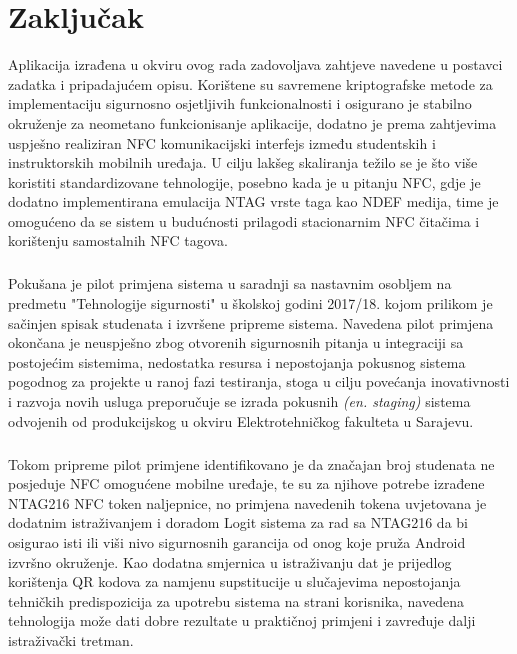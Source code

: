 \chapter{Zaključak} \label{chapter:conclusion}
Aplikacija izrađena u okviru ovog rada zadovoljava zahtjeve navedene u postavci zadatka i pripadajućem opisu. Korištene su savremene kriptografske metode za implementaciju sigurnosno osjetljivih funkcionalnosti i osigurano je stabilno okruženje za neometano funkcionisanje aplikacije, dodatno je prema zahtjevima uspješno realiziran NFC komunikacijski interfejs između studentskih i instruktorskih mobilnih uređaja. U cilju lakšeg skaliranja težilo se je što više koristiti standardizovane tehnologije, posebno kada je u pitanju NFC, gdje je dodatno implementirana emulacija NTAG vrste taga kao NDEF medija, time je omogućeno da se sistem u budućnosti prilagodi stacionarnim NFC čitačima i korištenju samostalnih NFC tagova.

\paragraph*{}
Pokušana je pilot primjena sistema u saradnji sa nastavnim osobljem na predmetu "Tehnologije sigurnosti" u školskoj godini 2017/18. kojom prilikom je sačinjen spisak studenata i izvršene pripreme sistema. Navedena pilot primjena okončana je neuspješno zbog otvorenih sigurnosnih pitanja u integraciji sa postojećim sistemima, nedostatka resursa i nepostojanja pokusnog sistema pogodnog za projekte u ranoj fazi testiranja, stoga u cilju povećanja inovativnosti i razvoja novih usluga preporučuje se izrada pokusnih \textit{(en. staging)} sistema odvojenih od produkcijskog u okviru Elektrotehničkog fakulteta u Sarajevu.

\paragraph*{}
Tokom pripreme pilot primjene identifikovano je da značajan broj studenata ne posjeduje NFC omogućene mobilne uređaje, te su za njihove potrebe izrađene NTAG216 NFC token naljepnice, no primjena navedenih tokena uvjetovana je dodatnim istraživanjem i doradom Logit sistema za rad sa NTAG216 da bi osigurao isti ili viši nivo sigurnosnih garancija od onog koje pruža Android izvršno okruženje. Kao dodatna smjernica u istraživanju dat je prijedlog korištenja QR kodova za namjenu supstitucije u slučajevima nepostojanja tehničkih predispozicija za upotrebu sistema na strani korisnika, navedena tehnologija može dati dobre rezultate u praktičnoj primjeni i zavređuje dalji istraživački tretman.

